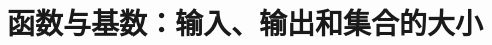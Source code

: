 \chapter[函数与基数]{函数与基数：输入、输出和集合的大小}



\newpage


\newpage


\newpage


\newpage


\newpage


\newpage


\newpage


\newpage
